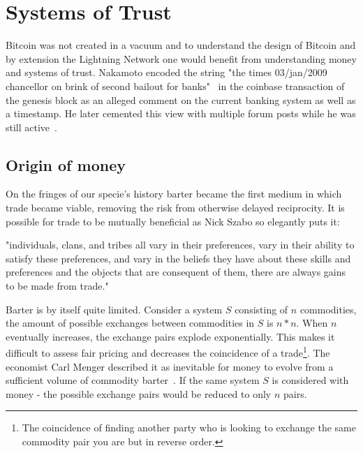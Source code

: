 \chapter{Systems of Trust}
\label{sec:macroeconomics}

Bitcoin was not created in a vacuum and to understand the design of Bitcoin and by extension the Lightning Network one would
benefit from understanding money and systems of trust. Nakamoto encoded the string "the times 03/jan/2009 chancellor on brink of second bailout for banks"~\cite{repository:bitcoin:sourceforge, bitcoin:genesis:coinbase} in the coinbase transaction of the genesis block as an alleged comment on the current banking system as well as a timestamp. He later cemented this view with multiple forum posts while he was still active~\cite{nakamoto:post:deflation, nakamoto:govern:print}.

\section{Origin of money}

On the fringes of our specie's history barter became the first medium in which trade became viable, removing the risk from otherwise delayed reciprocity. It is possible for trade to be mutually beneficial as Nick Szabo so elegantly puts it:

\begin{displayquote}

"individuals, clans, and tribes all vary in their preferences, vary in their ability to satisfy these preferences, and vary in the beliefs they have about these skills and preferences and the objects that are consequent of them, there are always gains to be made from trade."~\cite{szabo:shelling:out}

\end{displayquote}

Barter is by itself quite limited. Consider a system $S$
consisting of $n$ commodities, the amount of possible exchanges between commodities in $S$ is $n * n$. When $n$ eventually increases, the exchange pairs explode exponentially. This makes it difficult to assess fair pricing and decreases the coincidence of a trade\footnote{The coincidence of finding another party who is looking to exchange the same commodity pair you are but in reverse order.}. The economist Carl Menger described it as inevitable for money to evolve from a sufficient volume of commodity barter~\cite{menger:origins:money}. If the same system $S$ is considered with money - the possible exchange pairs would be reduced to only $n$ pairs. 

